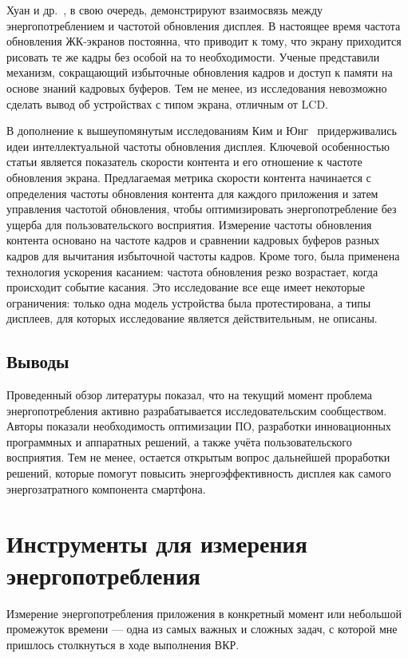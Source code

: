 \documentclass[a4paper,14pt]{extarticle} %
\begin{document}
	Хуан и др.~\parencite{huang2014intelligent}, в свою очередь, демонстрируют взаимосвязь между энергопотреблением и частотой обновления дисплея. В настоящее время частота обновления ЖК-экранов постоянна, что приводит к тому, что экрану приходится рисовать те же кадры без особой на то необходимости. Ученые представили механизм, сокращающий избыточные обновления кадров и доступ к памяти на основе знаний кадровых буферов. Тем не менее, из исследования невозможно сделать вывод об устройствах с типом экрана, отличным от LCD.
	
	В дополнение к вышеупомянутым исследованиям Ким и Юнг~\parencite{kim2014content} придерживались идеи интеллектуальной частоты обновления дисплея. Ключевой особенностью статьи является показатель скорости контента и его отношение к частоте обновления экрана. Предлагаемая метрика скорости контента начинается с определения частоты обновления контента для каждого приложения и затем управления частотой обновления, чтобы оптимизировать энергопотребление без ущерба для пользовательского восприятия. Измерение частоты обновления контента основано на частоте кадров и сравнении кадровых буферов разных кадров для вычитания избыточной частоты кадров. Кроме того, была применена технология ускорения касанием: частота обновления резко возрастает, когда происходит событие касания. Это исследование все еще имеет некоторые ограничения: только одна модель устройства была протестирована, а типы дисплеев, для которых исследование является действительным, не описаны.
	
	\subsection{Выводы}
	
	Проведенный обзор литературы показал, что на текущий момент проблема энергопотребления активно разрабатывается исследовательским сообществом. Авторы показали необходимость оптимизации ПО, разработки инновационных программных и аппаратных решений, а также учёта пользовательского восприятия. Тем не менее, остается открытым вопрос дальнейшей проработки решений, которые помогут повысить энергоэффективность дисплея как самого энергозатратного компонента смартфона.
	
	\newpage
	\section{Инструменты для измерения энергопотребления}
	
	Измерение энергопотребления приложения в конкретный момент или небольшой промежуток времени — одна из самых важных и сложных задач, с которой мне пришлось  столкнуться в ходе выполнения ВКР.
	
\end{document}
